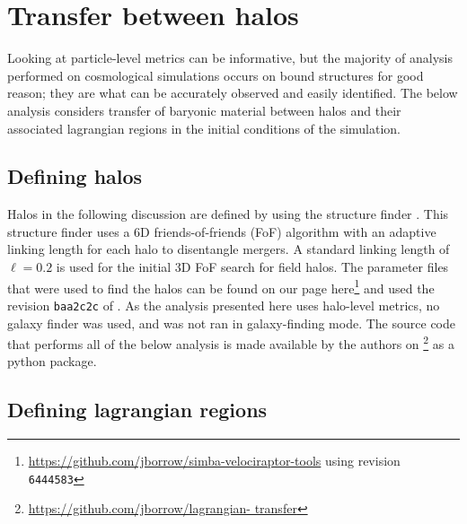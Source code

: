 \section{Transfer between halos}
\label{sec:transfer}

Looking at particle-level metrics can be informative, but the majority of
analysis performed on cosmological simulations occurs on bound structures for
good reason; they are what can be accurately observed and easily identified.
The below analysis considers transfer of baryonic material between halos and
their associated lagrangian regions in the initial conditions of the
simulation.

\subsection{Defining halos}

Halos in the following discussion are defined by using the \velociraptor{} structure
finder \citep{Elahi2019}. This structure finder uses a 6D friends-of-friends (FoF) algorithm
with an adaptive linking length for each halo to disentangle mergers. A standard
linking length of $\ell = 0.2$ is used for the initial 3D FoF search for field halos.
The parameter files that were used to find the halos can be found on our \github{}
page here\footnote{\url{https://github.com/jborrow/simba-velociraptor-tools} using
revision {\tt 6444583}} and used the revision {\tt baa2c2c} of
\velociraptor{}. As the analysis presented here uses halo-level metrics, no galaxy
finder was used, and \velociraptor{} was not ran in galaxy-finding mode.
The source code that performs all of the below analysis is made available by
the authors on \github{}\footnote{\url{https://github.com/jborrow/lagrangian-
transfer}} as a python package.

\subsection{Defining lagrangian regions}


